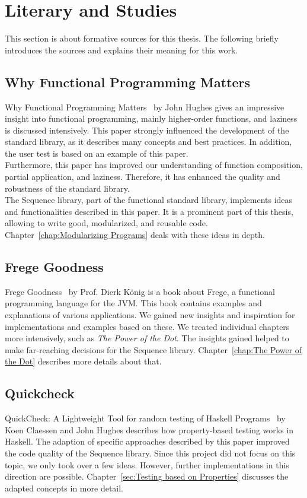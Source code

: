 \section{Literary and Studies}
\label{sec:Literary and Studies}
This section is about formative sources for this thesis. The following briefly
introduces the sources and explains their meaning for this work.

\subsection{Why Functional Programming Matters}
\label{sub:Functional Programming Matters}
Why Functional Programming Matters~\cite{hughes_why_1989} by John Hughes gives
an impressive insight into functional programming, mainly higher-order
functions, and laziness is discussed intensively. This paper strongly
influenced the development of the standard library, as it describes many
concepts and best practices. In addition, the user test is based on an example
of this paper. \\ 
Furthermore, this paper has improved our understanding of function composition,
partial application, and laziness. Therefore, it has enhanced the quality and
robustness of the standard library. \\
The Sequence library, part of the functional standard library, implements ideas
and functionalities described in this paper. It is a prominent part of this
thesis, allowing to write good, modularized, and reusable code.
Chapter~\ref{chap:Modularizing Programs} deals with these ideas in depth.


\subsection{Frege Goodness}
\label{sub:Frege Goodness}
Frege Goodness~\cite{frege_goodness} by Prof. Dierk König is a book about
Frege, a functional programming language for the JVM. This book contains
examples and explanations of various applications. We gained new insights and
inspiration for implementations and examples based on these. We treated
individual chapters more intensively, such as \textit{The Power of the Dot}.
The insights gained helped to make far-reaching decisions for the Sequence
library. Chapter~\ref{chap:The Power of the Dot} describes more details about
that.

\subsection{Quickcheck}
\label{sub:Quickcheck}
QuickCheck: A Lightweight Tool for random testing of Haskell
Programs~\cite{quickcheck_hughes} by Koen Claessen and John Hughes describes
how property-based testing works in Haskell. The adaption of specific
approaches described by this paper improved the code quality of the Sequence
library. Since this project did not focus on this topic, we only took over a few
ideas. However, further implementations in this direction are possible.
Chapter~\ref{sec:Testing based on Properties} discusses the adapted
concepts in more detail. 

